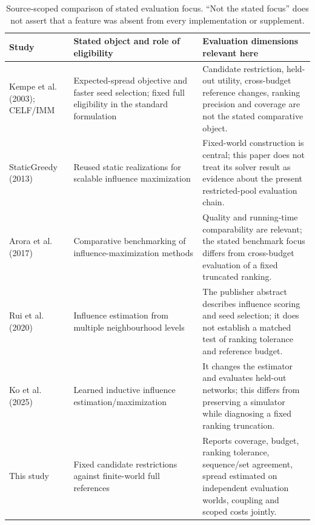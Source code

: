 \begin{table}[htbp]
\caption{Source-scoped comparison of stated evaluation focus. ``Not the stated focus'' does not assert that a feature was absent from every implementation or supplement.}\label{tab:related-scope}
\begin{tabularx}{\linewidth}{p{.19\linewidth}p{.31\linewidth}X}
\toprule
Study & Stated object and role of eligibility & Evaluation dimensions relevant here \\
\midrule
Kempe et al. (2003); CELF/IMM & Expected-spread objective and faster seed selection; fixed full eligibility in the standard formulation & Candidate restriction, held-out utility, cross-budget reference changes, ranking precision and coverage are not the stated comparative object. \\
StaticGreedy (2013) & Reused static realizations for scalable influence maximization & Fixed-world construction is central; this paper does not treat its solver result as evidence about the present restricted-pool evaluation chain. \\
Arora et al. (2017) & Comparative benchmarking of influence-maximization methods & Quality and running-time comparability are relevant; the stated benchmark focus differs from cross-budget evaluation of a fixed truncated ranking. \\
Rui et al. (2020) & Influence estimation from multiple neighbourhood levels & The publisher abstract describes influence scoring and seed selection; it does not establish a matched test of ranking tolerance and reference budget. \\
Ko et al. (2025) & Learned inductive influence estimation/maximization & It changes the estimator and evaluates held-out networks; this differs from preserving a simulator while diagnosing a fixed ranking truncation. \\
This study & Fixed candidate restrictions against finite-world full references & Reports coverage, budget, ranking tolerance, sequence/set agreement, spread estimated on independent evaluation worlds, coupling and scoped costs jointly. \\
\bottomrule
\end{tabularx}
\end{table}
